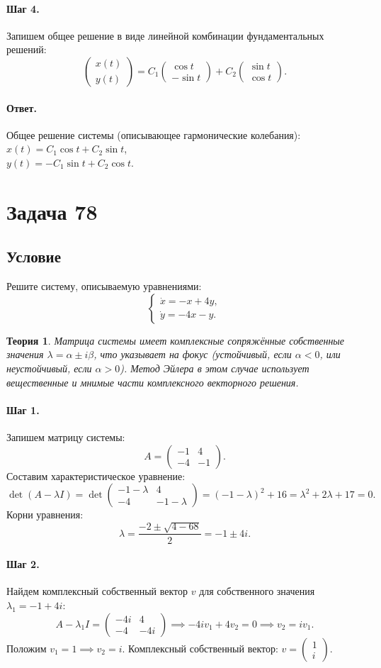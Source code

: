\documentclass[12pt,a4paper]{article}
\theoremstyle{solution}
\newtheorem*{theory}{Теория}
\newcommand{\task}[1]{\newpage\section*{Задача #1}}
\newcommand{\answer}{\paragraph{Ответ.}}
\newcommand{\step}[1]{\paragraph{Шаг #1.}}
\begin{document}
\step{4} Запишем общее решение в виде линейной комбинации фундаментальных решений:
\[
\begin{pmatrix} x(t) \\ y(t) \end{pmatrix} = C_1 \begin{pmatrix} \cos t \\ -\sin t \end{pmatrix} + C_2 \begin{pmatrix} \sin t \\ \cos t \end{pmatrix}.
\]

\answer
Общее решение системы (описывающее гармонические колебания): \\
$x(t) = C_1 \cos t + C_2 \sin t$, \\
$y(t) = -C_1 \sin t + C_2 \cos t$.

\task{78}
\subsection*{Условие}
Решите систему, описываемую уравнениями:
\[
\begin{cases}
\dot{x} = -x + 4y, \\
\dot{y} = -4x - y.
\end{cases}
\]

\begin{theory}
Матрица системы имеет комплексные сопряжённые собственные значения $\lambda = \alpha \pm i\beta$, что указывает на фокус (устойчивый, если $\alpha < 0$, или неустойчивый, если $\alpha > 0$). Метод Эйлера в этом случае использует вещественные и мнимые части комплексного векторного решения.
\end{theory}

\step{1} Запишем матрицу системы:
\[
A = \begin{pmatrix} -1 & 4 \\ -4 & -1 \end{pmatrix}.
\]
Составим характеристическое уравнение:
\[
\det(A - \lambda I) = \det \begin{pmatrix} -1-\lambda & 4 \\ -4 & -1-\lambda \end{pmatrix} = (-1-\lambda)^2 + 16 = \lambda^2 + 2\lambda + 17 = 0.
\]
Корни уравнения:
\[
\lambda = \frac{-2 \pm \sqrt{4 - 68}}{2} = -1 \pm 4i.
\]

\step{2} Найдем комплексный собственный вектор $v$ для собственного значения $\lambda_1 = -1 + 4i$:
\[
A - \lambda_1 I = \begin{pmatrix} -4i & 4 \\ -4 & -4i \end{pmatrix} \implies -4i v_1 + 4v_2 = 0 \implies v_2 = i v_1.
\]
Положим $v_1 = 1 \implies v_2 = i$. Комплексный собственный вектор: $v = \begin{pmatrix} 1 \\ i \end{pmatrix}$.
\end{document}
